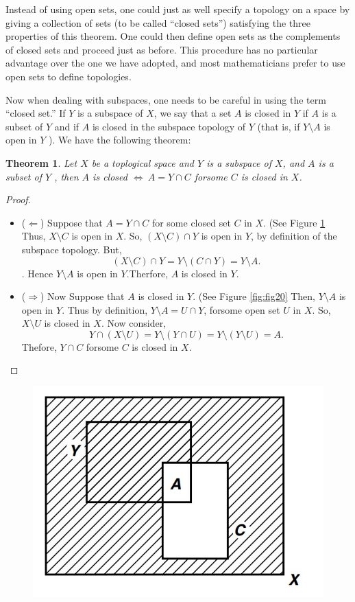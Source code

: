 \documentclass[
]{book}
\providecommand{\tightlist}{%
  \setlength{\itemsep}{0pt}\setlength{\parskip}{0pt}}
\newtheorem{theorem}{Theorem}[chapter]
\theoremstyle{definition}
\theoremstyle{definition}
\theoremstyle{definition}
\theoremstyle{definition}
\theoremstyle{remark}
\begin{document}
Instead of using open sets, one could just as well specify a topology on a space by giving a collection of sets (to be called ``closed sets'') satisfying the three properties of this theorem. One could then define open sets as the complements of closed sets and proceed just as before. This procedure has no particular advantage over the one we have adopted, and most mathematicians prefer to use open sets to define topologies.

Now when dealing with subspaces, one needs to be careful in using the term ``closed set.'' If \(Y\) is a subspace of \(X\), we say that a set \(A\) is closed in \(Y\) if \(A\) is a subset of \(Y\) and if \(A\) is closed in the subspace topology of \(Y\) (that is, if \(Y \setminus A\) is open in \(Y\) ). We have the following theorem:

\begin{theorem}
\protect\hypertarget{thm:qw}{}\label{thm:qw}Let \(X\) be a toplogical space and \(Y\) is a subspace of \(X\), and \(A\) is a subset of \(Y\) , then \(A\) is closed \(\iff ~A=Y \cap C\) forsome \(C\) is closed in \(X\).
\end{theorem}

\begin{proof}
\leavevmode

\begin{itemize}
\tightlist
\item
  (\(\Longleftarrow\)) Suppose that \(A=Y \cap C\) for some closed set \(C\) in \(X\). (See Figure \ref{fig:fig19} Thus, \(X\setminus C\) is open in \(X\). So, \((X\setminus C)\cap Y\) is open in \(Y\), by definition of the subspace topology. But,
  \[(X\setminus C)\cap Y=Y\setminus (C\cap Y)=Y\setminus A.\]
  . Hence \(Y \setminus A\) is open in \(Y\).Therfore, \(A\) is closed in \(Y\).
\item
  (\(\Longrightarrow\)) Now Suppose that \(A\) is closed in \(Y\). (See Figure \ref{fig:fig20} Then, \(Y\setminus A\) is open in \(Y\). Thus by definition, \(Y\setminus A= U \cap Y\), forsome open set \(U\) in \(X\). So, \(X\setminus U\) is closed in \(X\). Now consider,
  \[Y \cap (X\setminus U)=Y\setminus (Y \cap U)=Y\setminus (Y \setminus U)=A.\]
  Thefore, \(Y \cap C\) forsome \(C\) is closed in \(X\).
\end{itemize}

\end{proof}

\begin{figure}
\includegraphics[width=0.5\linewidth]{figures/figure 19} \caption{$~$}\label{fig:fig19}
\end{figure}
\end{document}
